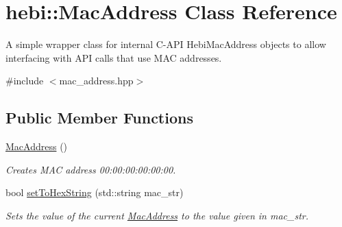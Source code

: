 \hypertarget{classhebi_1_1MacAddress}{}\section{hebi\+:\+:Mac\+Address Class Reference}
\label{classhebi_1_1MacAddress}


A simple wrapper class for internal C-\/\+A\+PI Hebi\+Mac\+Address objects to allow interfacing with A\+PI calls that use M\+AC addresses.  




{\ttfamily \#include $<$mac\+\_\+address.\+hpp$>$}

\subsection*{Public Member Functions}
\begin{DoxyCompactItemize}
\item 
\hyperlink{classhebi_1_1MacAddress_a5d943aac7186bba333a443e84e26aacd}{Mac\+Address} ()\hypertarget{classhebi_1_1MacAddress_a5d943aac7186bba333a443e84e26aacd}{}\label{classhebi_1_1MacAddress_a5d943aac7186bba333a443e84e26aacd}

\begin{DoxyCompactList}\small\item\em Creates M\+AC address 00\+:00\+:00\+:00\+:00\+:00. \end{DoxyCompactList}\item 
bool \hyperlink{classhebi_1_1MacAddress_a3e661d4efb84ca1743f5fe6acfd8ed8c}{set\+To\+Hex\+String} (std\+::string mac\+\_\+str)
\begin{DoxyCompactList}\small\item\em Sets the value of the current \hyperlink{classhebi_1_1MacAddress}{Mac\+Address} to the value given in \textquotesingle{}mac\+\_\+str\textquotesingle{}. \end{DoxyCompactList}\end{DoxyCompactItemize}
